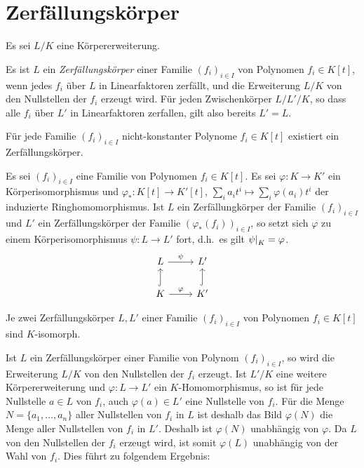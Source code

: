 \section{Zerfällungskörper}

Es sei $L/K$ eine Körpererweiterung.

\begin{definition}
  Es ist $L$ ein \emph{Zerfällungskörper} einer Familie $(f_i)_{i \in I}$ von Polynomen $f_i \in K[t]$, wenn jedes $f_i$ über $L$ in Linearfaktoren zerfällt, und die Erweiterung $L/K$ von den Nullstellen der $f_i$ erzeugt wird.
  Für jeden Zwischenkörper $L/L'/K$, so dass alle $f_i$ über $L'$ in Linearfaktoren zerfallen, gilt also bereits $L' = L$.
\end{definition}

\begin{lemma}
  Für jede Familie $(f_i)_{i \in I}$ nicht-konstanter Polynome $f_i \in K[t]$ existiert ein Zerfällungskörper.
\end{lemma}

\begin{lemma}
  Es sei $(f_i)_{i \in I}$ eine Familie von Polynomen $f_i \in K[t]$.
  Es sei $\varphi \colon K \to K'$ ein Körperisomorphismus und $\varphi_* \colon K[t] \to K'[t]$, $\sum_i a_i t^i \mapsto \sum_i \varphi(a_i) t^i$ der induzierte Ringhomomorphismus.
  Ist $L$ ein Zerfällungkörper der Familie $(f_i)_{i \in I}$ und $L'$ ein Zerfällungskörper der Familie $(\varphi_*(f_i))_{i \in I}$, so setzt sich $\varphi$ zu einem Körperisomorphismus $\psi \colon L \to L'$ fort, d.h.\ es gilt $\restrict{\psi}{K} = \varphi$.
  \[
    \begin{tikzcd}
      L
        \arrow{r}[above]{\psi}
      & L'
      \\
        K
        \arrow[hook]{u}
        \arrow{r}[above]{\varphi}
      & K'
        \arrow[hook]{u}
    \end{tikzcd}
  \]
\end{lemma}

\begin{corollary}
  Je zwei Zerfällungskörper $L, L'$ einer Familie $(f_i)_{i \in I}$ von Polynomen $f_i \in K[t]$ sind $K$-isomorph.
\end{corollary}

Ist $L$ ein Zerfällungskörper einer Familie von Polynom $(f_i)_{i \in I}$, so wird die Erweiterung $L/K$ von den Nullstellen der $f_i$ erzeugt.
Ist $L'/K$ eine weitere Körpererweiterung und $\varphi \colon L \to L'$ ein $K$-Homomorphismus, so ist für jede Nullstelle $a \in L$ von $f_i$, auch $\varphi(a) \in L'$ eine Nullstelle von $f_i$.
Für die Menge $N = \{ a_1, \dotsc, a_n \}$ aller Nullstellen von $f_i$ in $L$ ist deshalb das Bild $\varphi(N)$ die Menge aller Nullstellen von $f_i$ in $L'$.
Deshalb ist $\varphi(N)$ unabhängig von $\varphi$.
Da $L$ von den Nullstellen der $f_i$ erzeugt wird, ist somit $\varphi(L)$ unabhängig von der Wahl von $f_i$.
Dies führt zu folgendem Ergebnis:

